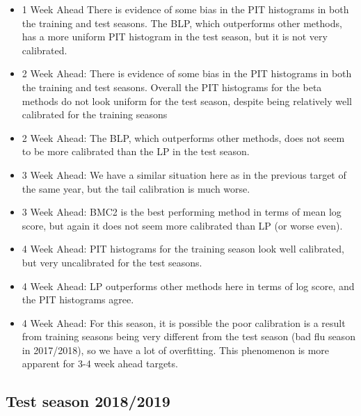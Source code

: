 \documentclass[
]{article}
\begin{document}
\begin{itemize}
\item 1 Week Ahead There is evidence of some bias in the PIT histograms in both the training and test seasons. The BLP, which outperforms other methods, has a more uniform PIT histogram in the test season, but it is not very calibrated.
\item 2 Week Ahead: There is evidence of some bias in the PIT histograms in both the training and test seasons. Overall the PIT histograms for the beta methods do not look uniform for the test season, despite being relatively well calibrated for the training seasons
\item 2 Week Ahead: The BLP, which outperforms other methods, does not seem to be more calibrated than the LP in the test season.
\item 3 Week Ahead: We have a similar situation here as in the previous target of the same year, but the tail calibration is much worse.
\item 3 Week Ahead: BMC2 is the best performing method in terms of mean log score, but again it does not seem more calibrated than LP (or worse even).
\item 4 Week Ahead: PIT histograms for the training season look well calibrated, but very uncalibrated for the test seasons.
\item 4 Week Ahead: LP outperforms other methods here in terms of log score, and the PIT histograms agree.
\item 4 Week Ahead: For this season, it is possible the poor calibration is a result from training seasons being very different from the test season (bad flu season in 2017/2018), so we have a lot of overfitting. This phenomenon is more apparent for 3-4 week ahead targets.
\end{itemize}

\newpage

\hypertarget{test-season-20182019}{%
\subsection{Test season 2018/2019}\label{test-season-20182019}}
\end{document}
